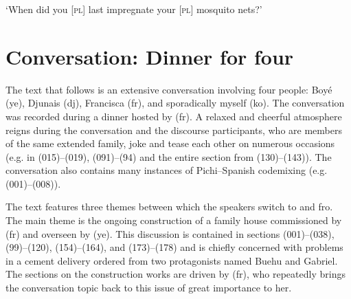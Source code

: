 {\glt
‘When did you [\textsc{pl}] last impregnate your [\textsc{pl}] mosquito nets?’
  }\z

\section{Conversation: Dinner for four}

The text that follows is an extensive conversation involving four people: Boyé (ye), Djunais (dj), Francisca (fr), and sporadically myself (ko). The conversation was recorded during a dinner hosted by (fr). A relaxed and cheerful atmosphere reigns during the conversation and the discourse participants, who are members of the same extended family, joke and tease each other on numerous occasions (e.g. in (015)–(019), (091)–(94) and the entire section from (130)–(143)). The conversation also contains many instances of Pichi–Spanish codemixing (e.g. (001)–(008)).


The text features three themes between which the speakers switch to and fro. The main theme is the ongoing construction of a family house commissioned by (fr) and overseen by (ye). This discussion is contained in sections (001)–(038), (99)–(120), (154)–(164), and (173)–(178) and is chiefly concerned with problems in a cement delivery ordered from two protagonists named Buehu and Gabriel. The sections on the construction works are driven by (fr), who repeatedly brings the conversation topic back to this issue of great importance to her.




